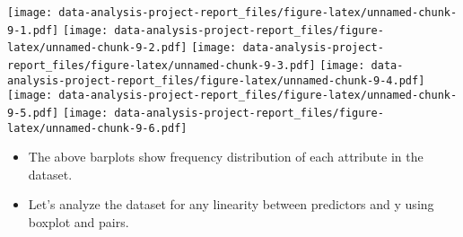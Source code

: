 \documentclass[
]{article}
\newenvironment{Shaded}{\begin{snugshade}}{\end{snugshade}}
\newcommand{\ControlFlowTok}[1]{\textcolor[rgb]{0.13,0.29,0.53}{\textbf{#1}}}
\newcommand{\DataTypeTok}[1]{\textcolor[rgb]{0.13,0.29,0.53}{#1}}
\newcommand{\DecValTok}[1]{\textcolor[rgb]{0.00,0.00,0.81}{#1}}
\newcommand{\FloatTok}[1]{\textcolor[rgb]{0.00,0.00,0.81}{#1}}
\newcommand{\KeywordTok}[1]{\textcolor[rgb]{0.13,0.29,0.53}{\textbf{#1}}}
\newcommand{\NormalTok}[1]{#1}
\newcommand{\OperatorTok}[1]{\textcolor[rgb]{0.81,0.36,0.00}{\textbf{#1}}}
\newcommand{\OtherTok}[1]{\textcolor[rgb]{0.56,0.35,0.01}{#1}}
\newcommand{\StringTok}[1]{\textcolor[rgb]{0.31,0.60,0.02}{#1}}
\begin{document}
\begin{Shaded}
\end{Shaded}

\texttt{[image: data-analysis-project-report\_files/figure-latex/unnamed-chunk-9-1.pdf]}
\texttt{[image: data-analysis-project-report\_files/figure-latex/unnamed-chunk-9-2.pdf]}
\texttt{[image: data-analysis-project-report\_files/figure-latex/unnamed-chunk-9-3.pdf]}
\texttt{[image: data-analysis-project-report\_files/figure-latex/unnamed-chunk-9-4.pdf]}
\texttt{[image: data-analysis-project-report\_files/figure-latex/unnamed-chunk-9-5.pdf]}
\texttt{[image: data-analysis-project-report\_files/figure-latex/unnamed-chunk-9-6.pdf]}

\begin{itemize}
\item
  The above barplots show frequency distribution of each attribute in
  the dataset.
\item
  Let's analyze the dataset for any linearity between predictors and y
  using boxplot and pairs.
\end{itemize}

\begin{Shaded}
\end{Shaded}
\end{document}
